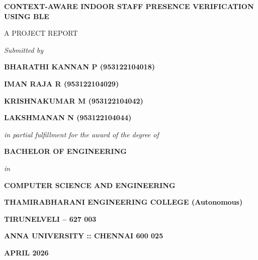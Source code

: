 \begin{titlepage}
    \begin{center}
        {\fontsize{18}{22}\selectfont \textbf{CONTEXT-AWARE INDOOR STAFF PRESENCE VERIFICATION USING BLE} \par}
        
        \vspace{1.5cm}
        {\fontsize{14}{17}\selectfont A PROJECT REPORT \par}
        
        \vspace{1cm}
        {\fontsize{14}{17}\selectfont \textit{Submitted by} \par}
        
        \vspace{1cm}
        {\fontsize{16}{20}\selectfont \textbf{BHARATHI KANNAN P (953122104018)} \par}
        {\fontsize{16}{20}\selectfont \textbf{IMAN RAJA R (953122104029)} \par}
        {\fontsize{16}{20}\selectfont \textbf{KRISHNAKUMAR M (953122104042)} \par}
        {\fontsize{16}{20}\selectfont \textbf{LAKSHMANAN N (953122104044)} \par}
        
        \vfill
        {\fontsize{14}{17}\selectfont \textit{in partial fulfillment for the award of the degree of} \par}
        
        \vspace{0.8cm}
        {\fontsize{16}{20}\selectfont \textbf{BACHELOR OF ENGINEERING} \par}
        {\fontsize{14}{17}\selectfont \textit{in} \par}
        {\fontsize{16}{20}\selectfont \textbf{COMPUTER SCIENCE AND ENGINEERING} \par}
        
        \vspace{1cm}
        {\fontsize{14}{17}\selectfont \textbf{THAMIRABHARANI ENGINEERING COLLEGE (Autonomous)} \par}
        {\fontsize{16}{20}\selectfont \textbf{TIRUNELVELI – 627 003} \par}
        
        \vspace{0.5cm}
        {\fontsize{16}{20}\selectfont \textbf{ANNA UNIVERSITY :: CHENNAI 600 025} \par}
        
        \vspace{0.5cm}
        {\fontsize{14}{17}\selectfont \textbf{APRIL 2026} \par}
    \end{center}
\end{titlepage}
